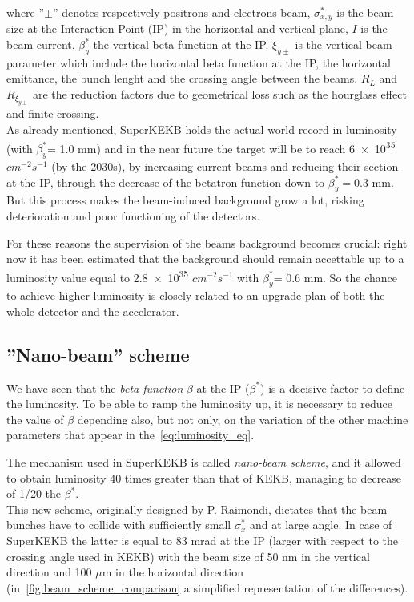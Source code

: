 where ''$\pm$'' denotes respectively positrons and electrons beam, $\sigma_{x,y}^{*}$ is the beam size at the Interaction Point (IP) in the horizontal and vertical plane, $I$ is the beam current, $\beta_{y}^{*}$ the vertical beta function at the IP. $\xi_{y\pm}$ is the vertical beam parameter which include the horizontal beta function at the IP, the horizontal emittance, the bunch lenght and the crossing angle between the beams. $R_{L}$ and $R_{\xi_{y\pm}}$ are the reduction factors due to geometrical loss such as the hourglass effect and finite crossing.\\

As already mentioned, SuperKEKB holds the actual world record in luminosity (with $\beta^{*}_{y}$= 1.0 mm) and in the near future the target will be to reach \num{6e35} $cm^{-2} s^{-1}$ (by the 2030s), by increasing current beams and reducing their section at the IP, through the decrease of the betatron function down to $\beta^{*}_{y}= 0.3$ mm. But this process makes the beam-induced background grow a lot, risking deterioration and poor functioning of the detectors.

For these reasons the supervision of the beams background becomes crucial: right now it has been estimated that the background should remain accettable up to a luminosity value equal to \num{2.8e35} $cm^{-2} s^{-1}$ with $\beta^{*}_{y}$= 0.6 mm.
So the chance to achieve higher luminosity is closely related to an upgrade plan of both the whole detector and the accelerator.


\subsection{''Nano-beam'' scheme} \label{sec:nano_beam}

We have seen that the \textit{beta function} $\beta$ at the IP ($\beta^{*}$) is a decisive factor to define the luminosity. To be able to ramp the luminosity up, it is necessary to reduce the value of $\beta$ depending also, but not only, on the variation of the other machine parameters that appear in the~\autoref{eq:luminosity_eq}.

The mechanism used in SuperKEKB is called \textit{nano-beam scheme}, and it allowed to obtain luminosity 40 times greater than that of KEKB, managing to decrease of 1/20 the $\beta^{*}$.\\

This new scheme, originally designed by P. Raimondi, dictates that the beam bunches have to collide with sufficiently small $\sigma_{x}^{*}$ and at large angle. In case of SuperKEKB the latter is equal to 83 mrad at the IP (larger with respect to the crossing angle used in KEKB) with the beam size of 50 nm in the vertical direction and 100 $\mu$m in the horizontal direction (in~\autoref{fig:beam_scheme_comparison} a simplified representation of the differences).

